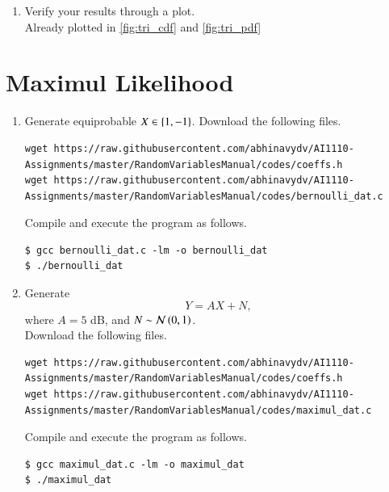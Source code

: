 \documentclass[journal,12pt,twocolumn]{IEEEtran}
\renewcommand\thesection{\arabic{section}}
\begin{document}
\begin{enumerate}[label=\thesection.\arabic*
        ,ref=\thesection.\theenumi]
    \item Verify your results through a plot.\\
          \solution
          Already plotted in \autoref{fig:tri_cdf} and \autoref{fig:tri_pdf}

\end{enumerate}
\section{Maximul Likelihood}
\begin{enumerate}[label=\thesection.\arabic*
        ,ref=\thesection.\theenumi]
    \item Generate equiprobable $X \in \left\{1,-1\right\}$.
          \solution
          Download the following files.
          \begin{lstlisting}
wget https://raw.githubusercontent.com/abhinavydv/AI1110-Assignments/master/RandomVariablesManual/codes/coeffs.h
wget https://raw.githubusercontent.com/abhinavydv/AI1110-Assignments/master/RandomVariablesManual/codes/bernoulli_dat.c
\end{lstlisting}

          Compile and execute the program as follows.
          \begin{lstlisting}
$ gcc bernoulli_dat.c -lm -o bernoulli_dat
$ ./bernoulli_dat
    \end{lstlisting}


    \item Generate
          \begin{equation}
              Y = AX+N,
          \end{equation}
          where $A = 5$ dB,  and $N \sim \mathcal{N}\left(0,1\right)$.\\
          \solution
          Download the following files.
          \begin{lstlisting}
wget https://raw.githubusercontent.com/abhinavydv/AI1110-Assignments/master/RandomVariablesManual/codes/coeffs.h
wget https://raw.githubusercontent.com/abhinavydv/AI1110-Assignments/master/RandomVariablesManual/codes/maximul_dat.c
\end{lstlisting}

          Compile and execute the program as follows.
          \begin{lstlisting}
$ gcc maximul_dat.c -lm -o maximul_dat
$ ./maximul_dat
    \end{lstlisting}



\end{enumerate}
\end{document}
